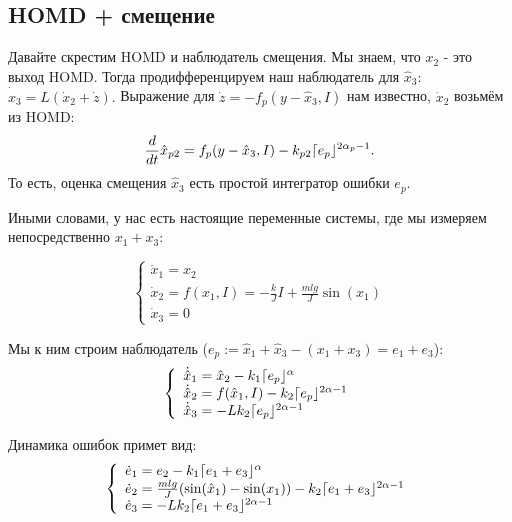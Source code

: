 \documentclass{article}
\DeclarePairedDelimiter{\homd}{\lceil}{\rfloor}
\begin{document}
\subsection{HOMD + смещение}

Давайте скрестим HOMD и наблюдатель смещения. Мы знаем, что $x_2$ - это выход HOMD. Тогда продифференцируем наш наблюдатель для $\hat{x}_3$:
$\dot{\hat{x}}_3 = L \left(\dot{x}_2 + \dot{z}\right).$
Выражение для $\dot{z} = -f_p(y-\hat{x}_3, I)$ нам известно, $\dot{x}_2$ возьмём из HOMD:
$$
\frac{d}{dt}\hat{x}_{p 2} = f_p(y-\hat{x}_3,I) - k_{p 2}\homd{e_p}^{2\alpha_p-1}.
$$
То есть, оценка смещения $\hat{x}_3$ есть простой интегратор ошибки $e_p$.


Иными словами, у нас есть настоящие переменные системы, где мы измеряем непосредственно $x_1+x_3$:

$$
\left\{
\begin{array}{l}
\dot{x}_1 = x_2\\
\dot{x}_2 = f(x_1, I) = -\frac{k}{J}I + \frac{mlg}{J}\sin(x_1)\\
\dot{x}_3 = 0
\end{array}
\right.
$$


Мы к ним строим наблюдатель ($e_p := \hat{x}_1 + \hat{x}_3 - (x_1+x_3) = e_1 + e_3$):
$$
\left\{
\begin{array}{l}
\dot{\hat{x}}_1 = \hat{x}_2 - k_1\homd{e_p}^{\alpha} \\
\dot{\hat{x}}_2 = f(\hat{x}_1, I) - k_2\homd{e_p}^{2\alpha-1}\\
\dot{\hat{x}}_3 = -L k_2\homd{e_p}^{2\alpha-1}
\end{array}
\right.
$$

Динамика ошибок примет вид:
$$
\left\{
\begin{array}{l}
\dot{e}_1 = e_2 - k_1\homd{e_1+e_3}^{\alpha} \\
\dot{e}_2 = \frac{mlg}{J}(\sin(\hat{x}_1) - \sin(x_1) ) - k_2\homd{e_1+e_3}^{2\alpha-1}\\
\dot{e}_3 = -L k_2\homd{e_1+e_3}^{2\alpha-1}
\end{array}
\right.
$$
\end{document}

